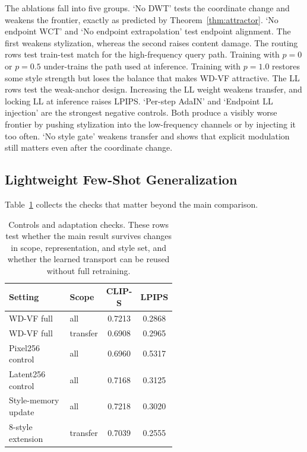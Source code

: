 \documentclass[letterpaper]{article}
\begin{document}
The ablations fall into five groups.
`No DWT' tests the coordinate change and weakens the frontier, exactly as predicted by Theorem~\ref{thm:attractor}.
`No endpoint WCT' and `No endpoint extrapolation' test endpoint alignment.
The first weakens stylization, whereas the second raises content damage.
The routing rows test train-test match for the high-frequency query path.
Training with $p=0$ or $p=0.5$ under-trains the path used at inference.
Training with $p=1.0$ restores some style strength but loses the balance that makes WD-VF attractive.
The LL rows test the weak-anchor design.
Increasing the LL weight weakens transfer, and locking LL at inference raises LPIPS.
`Per-step AdaIN' and `Endpoint LL injection' are the strongest negative controls.
Both produce a visibly worse frontier by pushing stylization into the low-frequency channels or by injecting it too often.
`No style gate' weakens transfer and shows that explicit modulation still matters even after the coordinate change.

\subsection{Lightweight Few-Shot Generalization}

Table~\ref{tab:controls} collects the checks that matter beyond the main comparison.

\begin{table}[t]
\centering
\caption{Controls and adaptation checks.
These rows test whether the main result survives changes in scope, representation, and style set, and whether the learned transport can be reused without full retraining.}
\label{tab:controls}
\scriptsize
\renewcommand{\arraystretch}{0.80}
\setlength{\tabcolsep}{3pt}
\begin{tabular}{@{}p{0.42\linewidth}p{0.14\linewidth}cc@{}}
\toprule
Setting & Scope & CLIP-S & LPIPS \\
\midrule
WD-VF full & all & 0.7213 & 0.2868 \\
WD-VF full & transfer & 0.6908 & 0.2965 \\
Pixel256 control & all & 0.6960 & 0.5317 \\
Latent256 control & all & 0.7168 & 0.3125 \\
Style-memory update & all & 0.7218 & 0.3020 \\
8-style extension & transfer & 0.7039 & 0.2555 \\
\bottomrule
\end{tabular}
\end{table}
\end{document}
